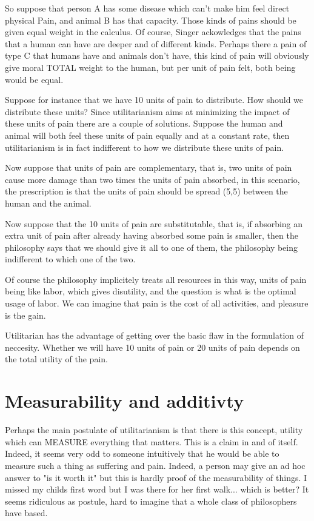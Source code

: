 
So suppose that person A has some disease which can't make him feel direct physical Pain, and animal B has that capacity. Those kinds of pains should be given equal weight in the calculus. Of course, Singer ackowledges that the pains that a human can have are deeper and of different kinds. Perhaps there a pain of type C that humans have and animals don't have, this kind of pain will obviously give moral TOTAL weight to the human, but per unit of pain felt, both being would be equal. 

Suppose for instance that we have 10 units of pain to distribute. How should we distribute these units? Since utilitarianism aims at minimizing the impact of these units of pain there are a couple of solutions. Suppose the human and animal will both feel these units of pain equally and at a constant rate, then utilitarianism is in fact indifferent to how we distribute these units of pain. 

Now suppose that units of pain are complementary, that is, two units of pain cause more damage than two times the units of pain absorbed, in this scenario, the prescription is that the units of pain should be spread (5,5) between the human and the animal. 

Now suppose that the 10 units of pain are substitutable, that is, if absorbing an extra unit of pain after already having absorbed some pain is smaller, then the philosophy says that we should give it all to one of them, the philosophy being indifferent to which one of the two. 

Of course the philosophy implicitely treats all resources in this way, units of pain being like labor, which gives disutility, and the question is what is the optimal usage of labor. We can imagine that pain is the cost of all activities, and pleasure is the gain. 

Utilitarian has the advantage of getting over the basic flaw in the formulation of neccesity. Whether we will have 10 units of pain or 20 units of pain depends on the total utility of the pain. 

\section{Measurability and additivty}

Perhaps the main postulate of utilitarianism is that there is this concept, utility which can MEASURE everything that matters. This is a claim in and of itself. Indeed, it seems very odd to someone intuitively that he would be able to measure such a thing as suffering and pain. Indeed, a person may give an ad hoc answer to "is it worth it" but this is hardly proof of the measurability of things. I missed my childs first word but I was there for her first walk... which is better? It seems ridiculous as postule, hard to imagine that a whole class of philosophers have based. 

